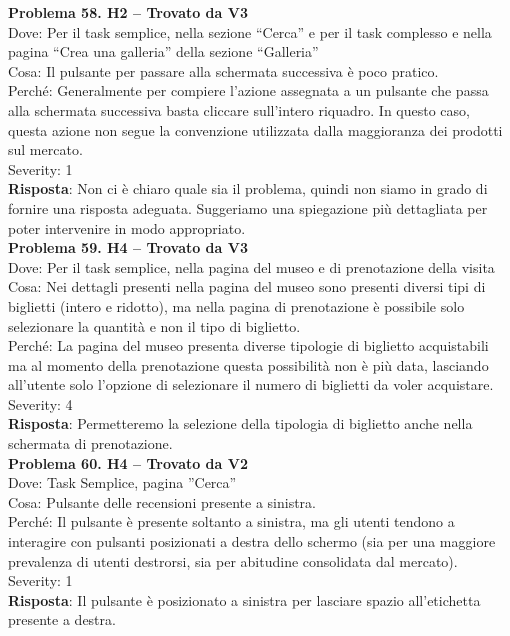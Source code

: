 \documentclass{article}
\begin{document}
\noindent \textbf{Problema 58. H2 – Trovato da V3} \\
Dove: Per il task semplice, nella sezione “Cerca” e per il task complesso e nella pagina “Crea una galleria” della sezione “Galleria” \\
Cosa: Il pulsante per passare alla schermata successiva è poco pratico. \\
Perché: Generalmente per compiere l’azione assegnata a un pulsante che passa alla schermata successiva basta cliccare sull’intero riquadro. In questo caso, questa azione non segue la convenzione utilizzata dalla maggioranza dei prodotti sul mercato. \\
Severity: 1 \\
\textbf{Risposta}: Non ci è chiaro quale sia il problema, quindi non siamo in grado di fornire una risposta adeguata. Suggeriamo una spiegazione più dettagliata per poter intervenire in modo appropriato.\\

\noindent \textbf{Problema 59. H4 – Trovato da V3} \\
Dove: Per il task semplice, nella pagina del museo e di prenotazione della visita \\
Cosa: Nei dettagli presenti nella pagina del museo sono presenti diversi tipi di biglietti (intero e ridotto), ma nella pagina di prenotazione è possibile solo selezionare la quantità e non il tipo di biglietto. \\
Perché: La pagina del museo presenta diverse tipologie di biglietto acquistabili ma al momento della prenotazione questa possibilità non è più data, lasciando all’utente solo l’opzione di selezionare il numero di biglietti da voler acquistare. \\
Severity: 4 \\
\textbf{Risposta}: Permetteremo la selezione della tipologia di biglietto anche nella schermata di prenotazione.\\

\noindent \textbf{Problema 60. H4 – Trovato da V2} \\
Dove: Task Semplice, pagina ”Cerca” \\
Cosa: Pulsante delle recensioni presente a sinistra. \\
Perché: Il pulsante è presente soltanto a sinistra, ma gli utenti tendono a interagire con pulsanti posizionati a destra dello schermo (sia per una maggiore prevalenza di utenti destrorsi, sia per abitudine consolidata dal mercato). \\
Severity: 1 \\
\textbf{Risposta}: Il pulsante è posizionato a sinistra per lasciare spazio all’etichetta presente a destra.\\
\end{document}

